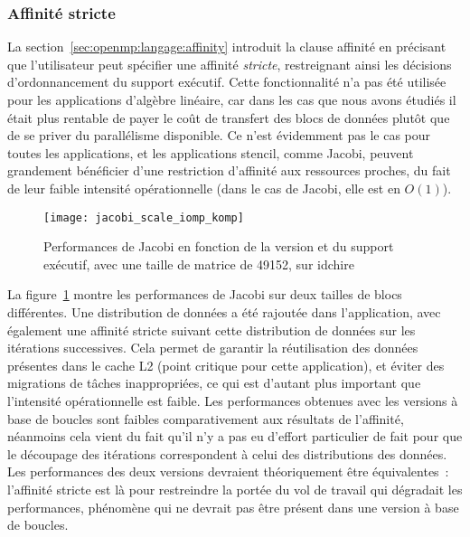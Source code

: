 


\subsubsection{Affinité stricte}

La section~\ref{sec:openmp:langage:affinity} introduit la clause affinité en précisant que l'utilisateur peut spécifier une affinité \emph{stricte}, restreignant ainsi les décisions d'ordonnancement du support exécutif.
Cette fonctionnalité n'a pas été utilisée pour les applications d'algèbre linéaire, car dans les cas que nous avons étudiés il était plus rentable de payer le coût de transfert des blocs de données plutôt que de se priver du parallélisme disponible.
Ce n'est évidemment pas le cas pour toutes les applications, et les applications stencil, comme Jacobi, peuvent grandement bénéficier d'une restriction d'affinité aux ressources proches, du fait de leur faible intensité opérationnelle (dans le cas de Jacobi, elle est en $O(1)$).

\begin{figure}[ht]
  \centering
  \texttt{[image: jacobi\_scale\_iomp\_komp]}
  \caption{Performances de Jacobi en fonction de la version et du support exécutif, avec une taille de matrice de 49152, sur idchire}\label{fig:contribs:perf_eval:eval-jacobi}
\end{figure}

La figure~\ref{fig:contribs:perf_eval:eval-jacobi} montre les performances de Jacobi sur deux tailles de blocs différentes.
Une distribution de données a été rajoutée dans l'application, avec également une affinité stricte suivant cette distribution de données sur les itérations successives.
Cela permet de garantir la réutilisation des données présentes dans le cache L2 (point critique pour cette application), et éviter des migrations de tâches inappropriées, ce qui est d'autant plus important que l'intensité opérationnelle est faible.
Les performances obtenues avec les versions à base de boucles sont faibles comparativement aux résultats de l'affinité, néanmoins cela vient du fait qu'il n'y a pas eu d'effort particulier de fait pour que le découpage des itérations correspondent à celui des distributions des données.
Les performances des deux versions devraient théoriquement être équivalentes~: l'affinité stricte est là pour restreindre la portée du vol de travail qui dégradait les performances, phénomène qui ne devrait pas être présent dans une version à base de boucles.
